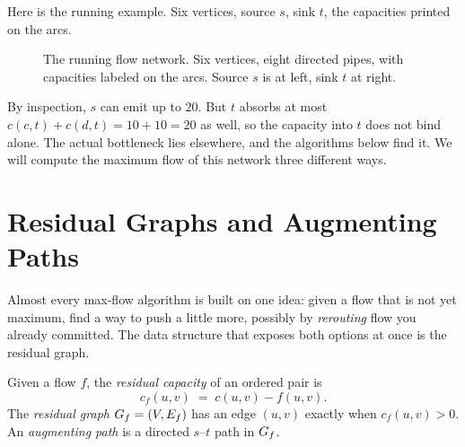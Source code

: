 Here is the running example. Six vertices, source $s$, sink $t$, the capacities
printed on the arcs.

\begin{figure}[H]
\centering
{}
\caption{The running flow network. Six vertices, eight directed pipes, with capacities labeled on the arcs. Source $s$ is at left, sink $t$ at right.}
\label{ch12:fig-running}
\end{figure}

By inspection, $s$ can emit up to $20$. But $t$ absorbs at most $c(c,t)+c(d,t)=
10+10=20$ as well, so the capacity into $t$ does not bind alone. The actual
bottleneck lies elsewhere, and the algorithms below find it. We will compute the
maximum flow of this network three different ways.

\section{Residual Graphs and Augmenting Paths}
\label{ch12:residual}

Almost every max-flow algorithm is built on one idea: given a flow that
is not yet maximum, find a way to push a little more, possibly by \emph{rerouting}
flow you already committed. The data structure that exposes both options at once
is the residual graph.

\begin{definition}
\label{ch12:def-residual}
Given a flow $f$, the \emph{residual capacity} of an ordered pair is
\[
  c_f(u,v) \;=\; c(u,v) - f(u,v).
\]
The \emph{residual graph} $G_f=(V,E_f)$ has an edge $(u,v)$ exactly when
$c_f(u,v)>0$. An \emph{augmenting path} is a directed $s$--$t$ path in $G_f$.
\end{definition}

